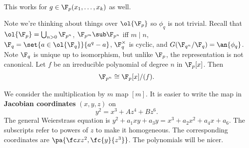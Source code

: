 This works for $g\in \F_p(x_1,\ldots, x_k)$ as well.

Note we're thinking about things over $\ol{\F_p}$ so $\phi_q$ is not trivial. Recall that $\ol{\F_p}=\bigcup_{n>0}\F_{p^n}$, $\F_{p^m}\sub \F_{p^n}$ iff $m\mid n$, $\F_q=\set{a\in \ol{\F_q}}{a^q-a}$, $\F_q^{\times}$ is cyclic, and $G(\F_{q^n}/\F_q)=\an{\phi_q}$. Note $\F_q$ is unique up to isomorphism, but unlike $\F_p$, the representation is not canonical. Let $f$ be an irreducible polynomial of degree $n$ in $\F_p[x]$. Then 
\[
\F_{p^n}\cong \F_p[x]/(f).
\]

We consider the multiplication by $m$ map $[m]$. It is easier to write the map in \textbf{Jacobian coordinates} $(x,y,z)$ on
\[
y^2=x^3+Az^4+Bz^6.
\] 
The general Weierstrass equation is $y^2+a_1xy +a_3y=x^3+a_2x^2+a_4x+a_6$. The subscripts refer to powers of $z$ to make it homogeneous. The corresponding coordinates are $\pa{\fc x{z^2},\fc{y}{z^3}}$. The polynomials will be nicer.

